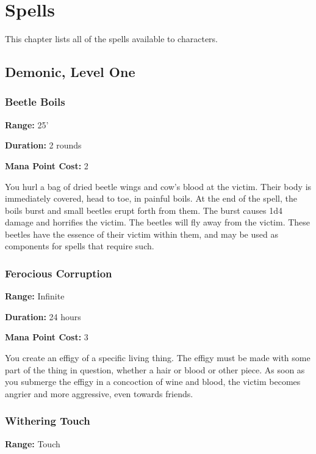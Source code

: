 \chapter{Spells}

\begin{multicols}{2}

This chapter lists all of the spells available to characters.

\section{Demonic, Level One}

\subsection{Beetle Boils}

\textbf{Range:} 25'

\textbf{Duration:} 2 rounds

\textbf{Mana Point Cost:} 2

You hurl a bag of dried beetle wings and cow's blood at the
victim. Their body is immediately covered, head to toe, in
painful boils. At the end of the spell, the boils burst and
small beetles erupt forth from them. The burst causes 1d4
damage and horrifies the victim. The beetles will fly away
from the victim. These beetles have the essence of their
victim within them, and may be used as components for spells
that require such.

\subsection{Ferocious Corruption}

\textbf{Range:} Infinite

\textbf{Duration:} 24 hours

\textbf{Mana Point Cost:} 3

You create an effigy of a specific living thing. The effigy must
be made with some part of the thing in question, whether a hair
or blood or other piece. As soon as you submerge the effigy in
a concoction of wine and blood, the victim becomes angrier
and more aggressive, even towards friends.

\subsection{Withering Touch}

\textbf{Range:} Touch


\end{multicols}
